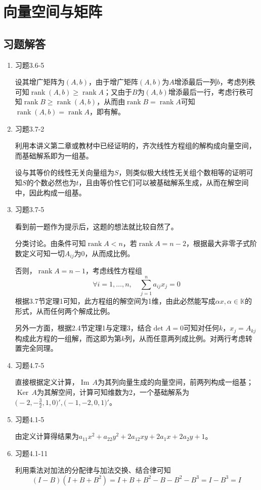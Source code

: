\documentclass[a4paper,UTF8,fontset=windows]{ctexart}
\DeclareMathOperator{\rank}{rank}
\DeclareMathOperator{\im}{Im\,}
\DeclareMathOperator{\Ker}{Ker\,}
\newcommand*{\note}{\noindent *}
\begin{document}
\section{向量空间与矩阵}
\subsection{习题解答}
\begin{enumerate}
    \item 习题3.6-5
    
    设其增广矩阵为$(A,b)$，由于增广矩阵$(A,b)$为$A$增添最后一列$b$，考虑列秩可知$\rank(A,b)\ge\rank A$；又由于$B$为$(A,b)$增添最后一行，考虑行秩可知$\rank B\ge\rank(A,b)$，从而由$\rank B=\rank A$可知$\rank(A,b)=\rank A$，即有解。

    \item 习题3.7-2
    
    利用本讲义第二章或教材中已经证明的，齐次线性方程组的解构成向量空间，而基础解系即为一组基。

    设与其等价的线性无关向量组为$S$，则类似极大线性无关组个数相等的证明可知$S$的个数必然也为$t$，且由等价性它们可以被基础解系生成，从而在解空间中，因此构成一组基。

    \item 习题3.7-5
    
    \note 看到前一题作为提示后，这题的想法就比较自然了。

    分类讨论。由条件可知$\rank A<n$，若$\rank A=n-2$，根据最大非零子式阶数定义可知一切$A_{ij}$为0，从而成比例。

    否则，$\rank A=n-1$，考虑线性方程组
    $$\forall i=1,\dots,n,\quad\sum_{j=1}^na_{ij}x_j=0$$
    根据3.7节定理1可知，此方程组的解空间为1维，由此必然能写成$\alpha x,\alpha\in\mathbb{K}$的形式，从而任何两个解成比例。

    另外一方面，根据2.4节定理1与定理3，结合$\det A=0$可知对任何$k$，$x_j=A_{kj}$构成此方程的一组解，而这即为第$k$列，从而任意两列成比例。对两行考虑转置完全同理。

    \item 习题4.7-5
    
    直接根据定义计算，$\im A$为其列向量生成的向量空间，前两列构成一组基；$\Ker A$为其解空间，计算可知维数为2，一个基础解系为$\big(-2,-\frac{3}{2},1,0\big)',\big(-1,-2,0,1\big)'$。

    \item 习题4.1-5
    
    由定义计算得结果为$a_{11}x^2+a_{22}y^2+2a_{12}xy+2a_1x+2a_2y+1$。

    \item 习题4.1-11
    
    利用乘法对加法的分配律与加法交换、结合律可知
    $$(I-B)(I+B+B^2)=I+B+B^2-B-B^2-B^3=I-B^3=I$$

\end{enumerate}
\end{document}
